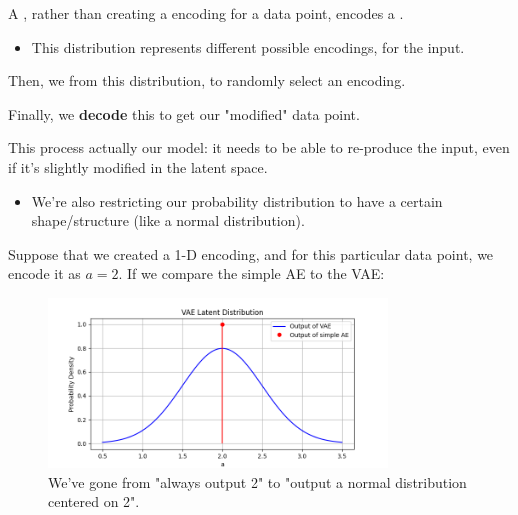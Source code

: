             \begin{definition}
                A , rather than creating a  encoding for a data point, encodes a .

                \begin{itemize}
                    \item This distribution represents different possible encodings, for the  input.
                \end{itemize}

                Then, we  from this distribution, to randomly select an encoding.

                Finally, we \textbf{decode} this to get our "modified" data point.

                \subsecdiv

                \item This process actually  our model: it needs to be able to re-produce the input, even if it's slightly modified in the latent space.

                \begin{itemize}
                    \item We're also restricting our probability distribution to have a certain shape/structure (like a normal distribution).
                \end{itemize}
                
            \end{definition}

            \miniex Suppose that we created a 1-D encoding, and for this particular data point, we encode it as $a=2$. If we compare the simple AE to the VAE:

            \begin{figure}[H]
                \centering
                \includegraphics[width=90mm,scale=0.5]{images/autoencoder_images/vae_latent_distribution.png}
                \caption*{We've gone from "always output 2" to "output a normal distribution centered on 2".}
            \end{figure}

